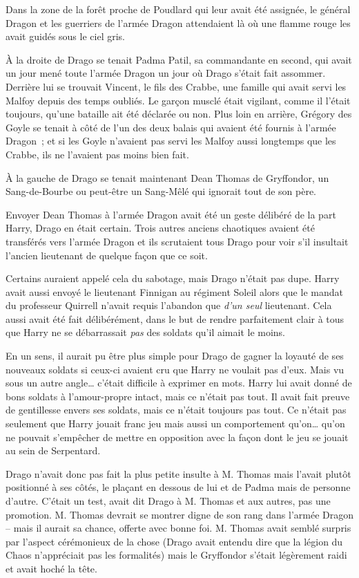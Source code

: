\later

Dans la zone de la forêt proche de Poudlard qui leur avait été assignée, le général Dragon et les guerriers de l'armée Dragon attendaient là où une flamme rouge les avait guidés sous le ciel gris.

À la droite de Drago se tenait Padma Patil, sa commandante en second, qui avait un jour mené toute l'armée Dragon un jour où Drago s'était fait assommer. Derrière lui se trouvait Vincent, le fils des Crabbe, une famille qui avait servi les Malfoy depuis des temps oubliés. Le garçon musclé était vigilant, comme il l'était toujours, qu'une bataille ait été déclarée ou non. Plus loin en arrière, Grégory des Goyle se tenait à côté de l'un des deux balais qui avaient été fournis à l'armée Dragon~; et si les Goyle n'avaient pas servi les Malfoy aussi longtemps que les Crabbe, ils ne l'avaient pas moins bien fait.

À la gauche de Drago se tenait maintenant Dean Thomas de Gryffondor, un Sang-de-Bourbe ou peut-être un Sang-Mêlé qui ignorait tout de son père.

Envoyer Dean Thomas à l'armée Dragon avait été un geste délibéré de la part Harry, Drago en était certain. Trois autres anciens chaotiques avaient été transférés vers l'armée Dragon et ils scrutaient tous Drago pour voir s'il insultait l'ancien lieutenant de quelque façon que ce soit.

Certains auraient appelé cela du sabotage, mais Drago n'était pas dupe. Harry avait aussi envoyé le lieutenant Finnigan au régiment Soleil alors que le mandat du professeur Quirrell n'avait requis l'abandon que \emph{d'un seul} lieutenant. Cela aussi avait été fait délibérément, dans le but de rendre parfaitement clair à tous que Harry ne se débarrassait \emph{pas} des soldats qu'il aimait le moins.

En un sens, il aurait pu être plus simple pour Drago de gagner la loyauté de ses nouveaux soldats si ceux-ci avaient cru que Harry ne voulait pas d'eux. Mais vu sous un autre angle… c'était difficile à exprimer en mots. Harry lui avait donné de bons soldats à l'amour-propre intact, mais ce n'était pas tout. Il avait fait preuve de gentillesse envers ses soldats, mais ce n'était toujours pas tout. Ce n'était pas seulement que Harry jouait franc jeu mais aussi un comportement qu'on… qu'on ne pouvait s'empêcher de mettre en opposition avec la façon dont le jeu se jouait au sein de Serpentard.

Drago n'avait donc pas fait la plus petite insulte à M. Thomas mais l'avait plutôt positionné à ses côtés, le plaçant en dessous de lui et de Padma mais de personne d'autre. C'était un test, avait dit Drago à M. Thomas et aux autres, pas une promotion. M. Thomas devrait se montrer digne de son rang dans l'armée Dragon -- mais il aurait sa chance, offerte avec bonne foi. M. Thomas avait semblé surpris par l'aspect cérémonieux de la chose (Drago avait entendu dire que la légion du Chaos n'appréciait pas les formalités) mais le Gryffondor s'était légèrement raidi et avait hoché la tête.

